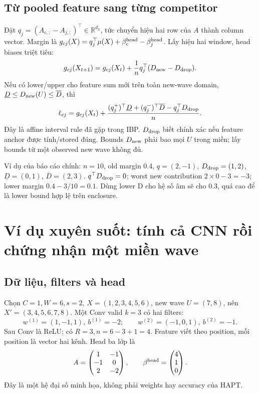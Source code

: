 \documentclass[11pt,a4paper]{article}
\newcommand{\R}{\mathbb R}
\theoremstyle{definition}
\begin{document}
\subsection{Từ pooled feature sang từng competitor}
Đặt $q_j=(A_{c,:}-A_{j,:})^\top\in\R^{d_h}$, tức chuyển hiệu hai row
của $A$ thành column vector. Margin là
$g_{cj}(X)=q_j^\top\mu(X)+\beta_c^{\rm head}-\beta_j^{\rm head}$.
Lấy hiệu hai window, head biases triệt tiêu:
\begin{equation}
g_{cj}(X_{t+1})=g_{cj}(X_t)
+\frac1nq_j^\top(D_{\rm new}-D_{\rm drop}).
\label{eq:margin-delta}
\end{equation}
Nếu có lower/upper cho feature sum mới trên toàn new-wave domain,
$\underline D\le D_{\rm new}(U)\le\overline D$, thì
\begin{equation}
\ell_{cj}=g_{cj}(X_t)+\frac{
(q_j^+)^\top\underline D+(q_j^-)^\top\overline D
-q_j^\top D_{\rm drop}}n.
\label{eq:tail}
\end{equation}
Đây là affine interval rule đã gặp trong IBP. $D_{\rm drop}$ biết chính
xác nếu feature anchor được tính/stored đúng. Bounds $D_{\rm new}$ phải
bao mọi $U$ trong miền; lấy bounds từ một observed new wave không đủ.

Ví dụ của báo cáo chính: $n=10$, old margin 0.4, $q=(2,-1)$,
$D_{\rm drop}=(1,2)$, $\underline D=(0,1)$, $\overline D=(2,3)$.
$q^\top D_{\rm drop}=0$; worst new contribution $2\times0-3=-3$;
lower margin $0.4-3/10=0.1$. Dùng lower D cho hệ số âm sẽ cho 0.3,
quá cao để là lower bound hợp lệ trên enclosure.

\section{Ví dụ xuyên suốt: tính cả CNN rồi chứng nhận một miền wave}
\subsection{Dữ liệu, filters và head}
Chọn $C=1,W=6,s=2$, $X=(1,2,3,4,5,6)$, new wave $U=(7,8)$, nên
$X'=(3,4,5,6,7,8)$. Một Conv valid $k=3$ có hai filters:
\begin{equation}
w^{(1)}=(1,-1,1),\ b^{(1)}=-2;\qquad
w^{(2)}=(-1,0,1),\ b^{(2)}=-1.
\end{equation}
Sau Conv là ReLU; có $R=3,n=6-3+1=4$. Feature viết theo position, mỗi
position là vector hai kênh. Head ba lớp là
\begin{equation}
A=\begin{pmatrix}1&-1\\-1&0\\2&-2\end{pmatrix},\qquad
\beta^{\rm head}=\begin{pmatrix}4\\1\\0\end{pmatrix}.
\end{equation}
Đây là một hệ đại số minh họa, không phải weights hay accuracy của HAPT.
\end{document}
